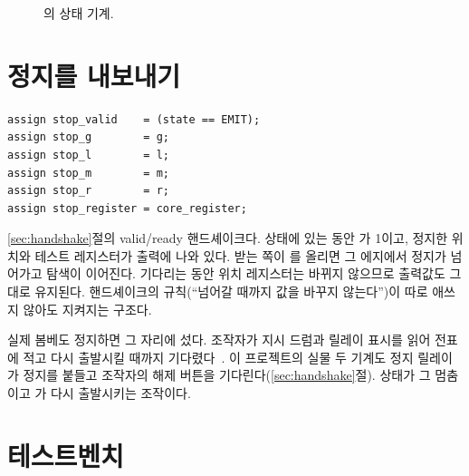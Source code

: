 \begin{figure}[ht]
\centering
{}
\caption{의 상태 기계.}
\label{fig:g-sweep-fsm}
\end{figure}

\section{정지를 내보내기}

\begin{lstlisting}[language=SV,numbers=none]
assign stop_valid    = (state == EMIT);
assign stop_g        = g;
assign stop_l        = l;
assign stop_m        = m;
assign stop_r        = r;
assign stop_register = core_register;
\end{lstlisting}

\ref{sec:handshake}절의 valid/ready 핸드셰이크다.  상태에 있는 동안 가 1이고,
정지한 위치와 테스트 레지스터가 출력에 나와 있다. 받는 쪽이 를 올리면 그 에지에서 정지가
넘어가고 탐색이 이어진다. 기다리는 동안 위치 레지스터는 바뀌지 않으므로 출력값도 그대로 유지된다.
핸드셰이크의 규칙(``넘어갈 때까지 값을 바꾸지 않는다'')이 따로 애쓰지 않아도 지켜지는 구조다.

\Ours 실제 봄베도 정지하면 그 자리에 섰다. 조작자가 지시 드럼과 릴레이 표시를 읽어 전표에 적고 다시
출발시킬 때까지 기다렸다~\cite[49]{us6812report1944}. 이 프로젝트의 실물 두 기계도 정지 릴레이가 정지를 붙들고
조작자의 해제 버튼을 기다린다(\ref{sec:handshake}절).  상태가 그 멈춤이고 가
다시 출발시키는 조작이다.

\section{테스트벤치}

